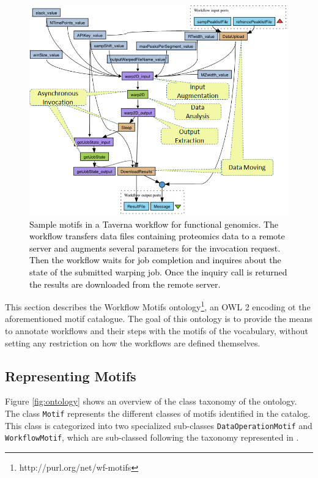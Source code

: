 \begin{figure}[ht!]
\centering
\includegraphics[scale=0.70]{Figures/taverna-wf-motifs.png}
\caption{\textcolor{black}{Sample motifs in a Taverna workflow for functional genomics. The workflow transfers data files containing proteomics data to a remote server and  augments several parameters for the invocation request. Then the workflow waits for job completion and inquires about the state of the submitted warping job. Once the inquiry call is returned the results are downloaded from the remote server.}}
\label{fig:tav_wf_motifs}
\end{figure}

This section describes the Workflow Motifs ontology\footnote{http://purl.org/net/wf-motifs}, an OWL 2 encoding ot the aforementioned motif catalogue. The goal of this ontology is to provide the means to annotate workflows and their steps with the motifs of the vocabulary, without setting any restriction on how the workflows are defined themselves.

\subsection{Representing Motifs}
Figure \ref{fig:ontology} shows an overview of the class taxonomy of the ontology. The class {\tt  Motif} represents the different classes of motifs identified in the catalog. This class is categorized into two specialized sub-classes {\tt  DataOperationMotif} and {\tt  WorkflowMotif}, which are sub-classed following the taxonomy represented in \cite{garijo_Alper_2012}.

